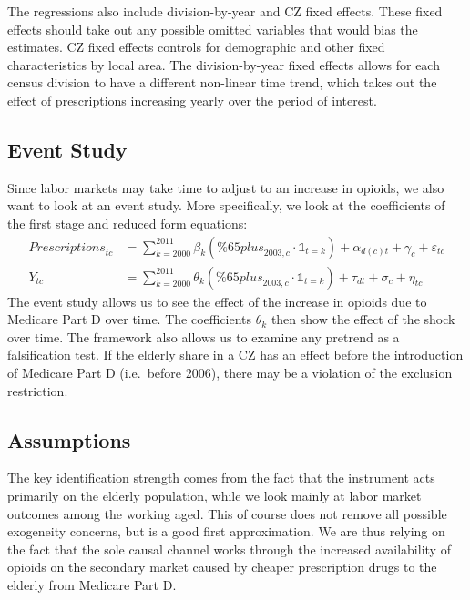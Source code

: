 \documentclass[12pt]{article}
\begin{document}
The regressions also include division-by-year and CZ fixed effects.  These fixed effects should take out any possible omitted variables that would bias the estimates.  CZ fixed effects controls for demographic and other fixed characteristics by local area.  The division-by-year fixed effects allows for each census division to have a different non-linear time trend, which takes out the effect of prescriptions increasing yearly over the period of interest.

\subsection{Event Study}
Since labor markets may take time to adjust to an increase in opioids, we also want to look at an event study.  More specifically, we look at the coefficients of the first stage and reduced form equations:
\begin{align*}
    \mathit{Prescriptions}_{tc} &= \sum_{k=2000}^{2011}\beta_k(\mathit{\%65plus}_{2003,c}\cdot\mathds{1}_{t=k}) + \alpha_{d(c)t} + \gamma_c + \varepsilon_{tc} \\
    Y_{tc} &= \sum_{k=2000}^{2011} \theta_k(\mathit{\%65plus}_{2003,c}\cdot\mathds{1}_{t=k}) + \tau_{dt} + \sigma_c + \eta_{tc}
\end{align*}
The event study allows us to see the effect of the increase in opioids due to Medicare Part D over time.  The coefficients $\theta_k$ then show the effect of the shock over time.  The framework also allows us to examine any pretrend as a falsification test.  If the elderly share in a CZ has an effect before the introduction of Medicare Part D (i.e.\ before 2006), there may be a violation of the exclusion restriction.


\subsection{Assumptions}
The key identification strength comes from the fact that the instrument acts primarily on the elderly population, while we look mainly at labor market outcomes among the working aged.  This of course does not remove all possible exogeneity concerns, but is a good first approximation.  We are thus relying on the fact that the sole causal channel works through the increased availability of opioids on the secondary market caused by cheaper prescription drugs to the elderly from Medicare Part D.
\end{document}

